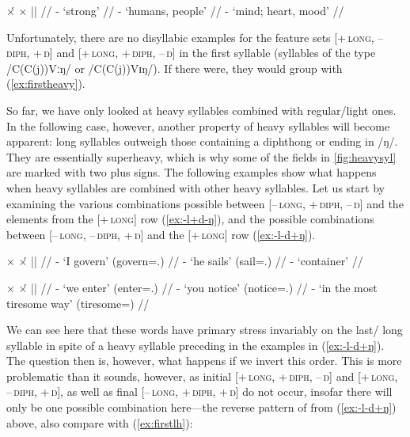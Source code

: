 \a\label{ex:firstheavy}\begingl
	\gla ×́		{}	×		||	{} //
	\glb {}	-			{}	{`strong'} //
	\glb {}	-		{}	{`humans, people'} //
	\glb {}	-			{}	{`mind; heart, mood'} //
\endgl
\xe

Unfortunately, there are no disyllabic examples for the feature sets 
\textsc{[+\,long, \mbox{–\,diph,} +\,ŋ]} and \textsc{[+\,long, +\,diph, –\,ŋ]} 
in the first syllable (syllables of the type /C(C(j))Vːŋ/ or /C(C(j))Vɪŋ/). 
If there were, they would group with (\ref{ex:firstheavy}).

So far, we have only looked at heavy syllables combined with regular/light ones. 
In the following case, however, another property of heavy syllables will become 
apparent: long syllables outweigh those containing a diphthong or ending in /ŋ/. 
They are essentially superheavy, which is why some 
of the fields in \autoref{fig:heavysyl} are marked with two plus signs. The 
following examples show what happens when heavy syllables are combined with 
other heavy syllables. Let us start by examining the various combinations 
possible between \textsc{[–\,long, +\,diph, –\,ŋ]} and the elements from the 
\textsc{[+\,long]} row (\ref{ex:-l+d-ŋ}), and the possible combinations between 
\textsc{[–\,long, \mbox{–\,diph,} +\,ŋ]} and the \textsc{[+\,long]} row 
(\ref{ex:-l-d+ŋ}).

\pex[everygla=\upshape]\label{ex:lastheavy}
\a\label{ex:-l+d-ŋ}\begingl
	\gla ×		{}	×́		||	{} //
	\glb {}	-		{}
		{`I govern' (govern=\Fsg{}.\Top{})} //
	\glb {}	-		{}	{`he sails' 
		(sail=\TsgM{}.\Aarg{})} //
	\glb {}	-		{}	{`container'} //
\endgl

\a\label{ex:-l-d+ŋ}\begingl
	\gla ×		{}	×́		||	{} //
	\glb {}	-		{}
		{`we enter' (enter=\Fpl{}.\Top{})} //
	\glb {}	-		{}
		{`you notice' (notice=\Ssg{}.\Aarg{})} //
	\glb {}	-		{}
		{`in the most tiresome way' (tiresome=\Supl{})} //
\endgl
\xe

We can see here that these words have primary stress invariably on the last/%
long syllable in spite of a heavy syllable preceding in the 
examples in (\ref{ex:-l-d+ŋ}). The question then is, however, what happens if 
we invert this order. This is more problematic than it sounds, however, as 
initial 
\textsc{[+\,long, +\,diph, –\,ŋ]} and \textsc{[+\,long, –\,diph, +\,ŋ]}, as 
well as final \textsc{[–\,long, +\,diph, +\,ŋ]} do not occur, insofar there 
will only be one possible combination here---the reverse pattern of 
 from (\ref{ex:-l-d+ŋ}) above, 
also compare with (\ref{ex:firstlh}):

